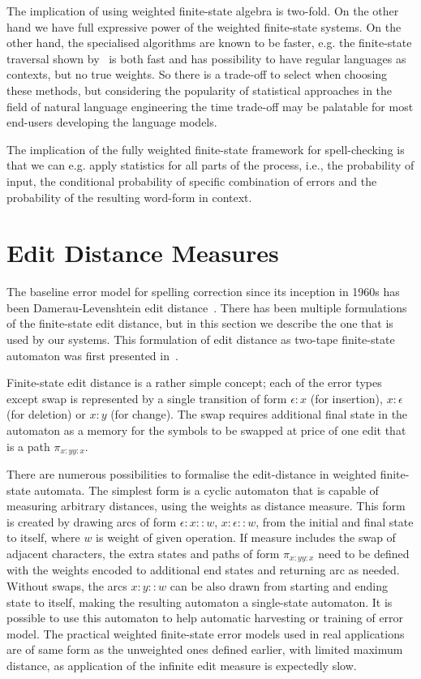 \documentclass[officiallayout,draft]{unihelcompling}
\begin{document}
The implication of using weighted finite-state algebra is two-fold. On the
other hand we have full expressive power of the weighted finite-state systems.
On the other hand, the specialised algorithms are known to be faster, e.g.  the
finite-state traversal shown by~\citet{hulden2009fast} is both fast and has
possibility to have regular languages as contexts, but no true weights. So
there is a trade-off to select when choosing these methods, but considering the
popularity of statistical approaches in the field of natural language
engineering the time trade-off may be palatable for most end-users developing
the language models.

The implication of the fully weighted finite-state framework for spell-checking
is that we can e.g. apply statistics for all parts of the process, i.e.,
the probability of input, the conditional probability of specific
combination of errors and the probability of the resulting word-form in 
context. 

\section{Edit Distance Measures}
\label{sec:edit-distance}

The baseline error model for spelling correction since its inception in 1960s
has been Damerau-Levenshtein edit
distance~\citep{damerau1964technique,levenshtein1966binary}. There has been
multiple formulations of the finite-state edit distance, but in this section
we describe the one that is used by our systems. This formulation of
edit distance as two-tape finite-state automaton was first presented 
in~\citet{schulz2002fast}.

Finite-state edit distance is a rather simple concept; each of the error types
except swap is represented by a single transition of form $\epsilon:x$ (for
insertion), $x:\epsilon$ (for deletion) or $x:y$ (for change). The swap
requires additional final state in the automaton as a memory for the symbols to
be swapped at price of one edit that is a path $\pi_{x:y y:x}$.

There are numerous possibilities to formalise the edit-distance in weighted
finite-state automata. The simplest form is a cyclic automaton that is
capable of measuring arbitrary distances, using the weights as distance 
measure. This form is created by drawing arcs of form $\epsilon:x::w$,
$x:\epsilon::w$, from the initial and final state to itself, 
where $w$ is weight of given operation. If measure includes the swap of 
adjacent characters, the extra states and paths of form $\pi_{x:y y:x}$ need to
be defined with the weights encoded to additional end states and returning arc
as needed. Without swaps, the arcs $x:y::w$ can be also drawn from starting
and ending state to itself, making the resulting automaton a single-state
automaton. It is possible to use this automaton to help automatic harvesting
or training of error model. The practical weighted finite-state error models
used in real applications are of same form as the unweighted ones defined
earlier, with limited maximum distance, as application of the infinite edit
measure is expectedly slow.
\end{document}
